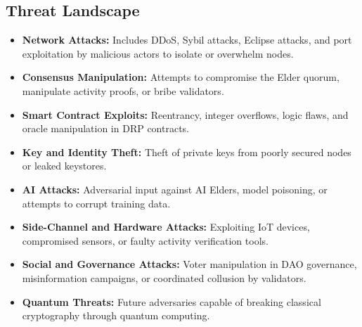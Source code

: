 \documentclass[11pt,a4paper]{article}
\begin{document}
\subsection{Threat Landscape}
\begin{itemize}
    \item \textbf{Network Attacks:}  
    Includes DDoS, Sybil attacks, Eclipse attacks, and port exploitation by malicious actors to isolate or overwhelm nodes.  

    \item \textbf{Consensus Manipulation:}  
    Attempts to compromise the Elder quorum, manipulate activity proofs, or bribe validators.  

    \item \textbf{Smart Contract Exploits:}  
    Reentrancy, integer overflows, logic flaws, and oracle manipulation in DRP contracts.  

    \item \textbf{Key and Identity Theft:}  
    Theft of private keys from poorly secured nodes or leaked keystores.  

    \item \textbf{AI Attacks:}  
    Adversarial input against AI Elders, model poisoning, or attempts to corrupt training data.  

    \item \textbf{Side-Channel and Hardware Attacks:}  
    Exploiting IoT devices, compromised sensors, or faulty activity verification tools.  

    \item \textbf{Social and Governance Attacks:}  
    Voter manipulation in DAO governance, misinformation campaigns, or coordinated collusion by validators.  

    \item \textbf{Quantum Threats:}  
    Future adversaries capable of breaking classical cryptography through quantum computing.  
\end{itemize}
\end{document}
